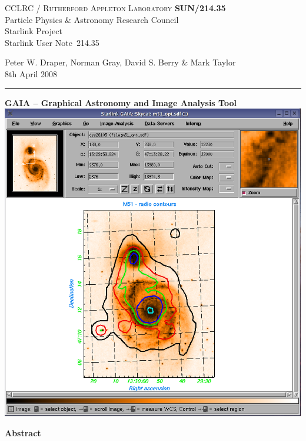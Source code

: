 \documentclass[twoside,11pt]{article}
\newcommand{\stardoccategory}  {Starlink User Note}
\newcommand{\stardocinitials}  {SUN}
\newcommand{\stardocnumber}    {214.35}
\newcommand{\stardocauthors}   {Peter W. Draper, 
                                Norman Gray, 
                                David S. Berry \& 
                                Mark Taylor }
\newcommand{\stardocdate}      {8th April 2008}
\newcommand{\stardoctitle}     {GAIA -- 
                                Graphical Astronomy and Image Analysis Tool}
\newcommand{\stardocname}{\stardocinitials /\stardocnumber}
\newenvironment{latexonly}{}{}
\renewcommand{\_}{\texttt{\symbol{95}}}
\begin{document}
\thispagestyle{empty}

\begin{latexonly}
   CCLRC / \textsc{Rutherford Appleton Laboratory} \hfill \textbf{\stardocname}\\
   {\large Particle Physics \& Astronomy Research Council}\\
   {\large Starlink Project\\}
   {\large \stardoccategory\ \stardocnumber}
   \begin{flushright}
   \stardocauthors\\
   \stardocdate
   \end{flushright}
   \vspace{-4mm}
   \rule{\textwidth}{0.5mm}
   \vspace{5mm}
   \begin{center}
   {\Large\textbf{\stardoctitle \\ [2.5ex]}}
   \vspace{5mm}
   \includegraphics[totalheight=5in]{sun214fig.ps}
   \end{center}

   \begin{center}
      {\Large\textbf{Abstract}}
   \end{center}
\end{latexonly}
\end{document}
